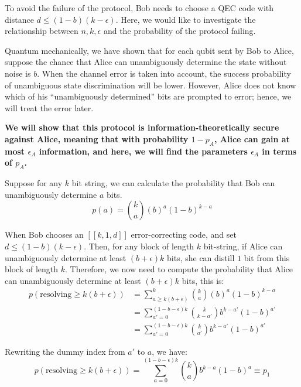 \documentclass[%
 reprint,
superscriptaddress,
 amsmath,amssymb,
 aps,
]{revtex4-2}
\begin{document}
To avoid the failure of the protocol, Bob needs to choose a QEC code with distance $d\le (1-b)(k-\epsilon)$. Here, we would like to investigate the relationship between $n, k, \epsilon$ and the probability of the protocol failing.

Quantum mechanically, we have shown that for each qubit sent by Bob to Alice, suppose the chance that Alice can unambiguously determine the state without noise is $b$. When the channel error is taken into account, the success probability of unambiguous state discrimination will be lower. However, Alice does not know which of his ``unambiguously determined'' bits are prompted to error; hence, we will treat the error later.


\textbf{We will show that this protocol is information-theoretically secure against Alice, meaning that with probability $1-p_A$, Alice can gain at most $\epsilon_A$ information, and here, we will find the parameters $\epsilon_A$ in terms of $p_A$.}

Suppose for any $k$ bit string, we can calculate the probability that Bob can unambiguously determine $a$ bits.
\begin{equation}
    p(a) = \binom{k}{a} \left(b\right)^a\left(1-b\right)^{k-a}
\end{equation}

When Bob chooses an $[[k, 1, d]]$ error-correcting code, and set $d \le(1-b)(k-\epsilon)$. Then, for any block of length $k$ bit-string, if Alice can unambiguously determine at least $(b+\epsilon)k$ bits, she can distill $1$ bit from this block of length $k$. Therefore, we now need to compute the probability that Alice can unambiguously determine at least $\left(b+\epsilon\right)k$ bits, this is:
\begin{equation}
\begin{split}
    p(\text{resolving}\ge k(b+\epsilon)) &= \sum_{a\ge k(b+\epsilon)}^k \binom{k}{a}\left(b\right)^a\left(1-b\right)^{k-a}\\
    &=\sum_{a'=0}^{(1-b-\epsilon)k}\binom{k}{k-a'}b^{k-a'}(1-b)^{a'}\\
    &=\sum_{a'=0}^{(1-b-\epsilon)k}\binom{k}{a'}b^{k-a'}(1-b)^{a'}
\end{split}
\end{equation}

Rewriting the dummy index from $a'$ to $a$, we have:
\begin{equation}
    p(\text{resolving}\ge k(b+\epsilon)) = \sum_{a=0}^{(1-b-\epsilon)k}\binom{k}{a}b^{k-a}(1-b)^{a}\equiv p_1
    \label{eq:p_each_block}
\end{equation}
\end{document}
